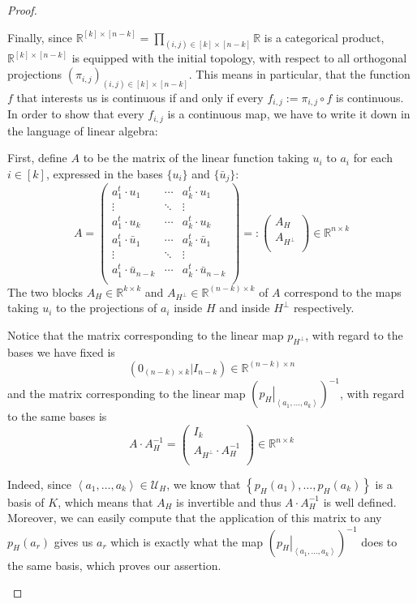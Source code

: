\begin{proof}
\begin{b_item}
Finally, since $\mathbb{R}^{[k]\times[n-k]}=\prod_{(i,j)\in[k]\times[n-k]}\mathbb{R}$ is a categorical product, $\mathbb{R}^{[k]\times[n-k]}$ is equipped with the initial topology, with respect to all orthogonal projections $\left(\pi_{i,j}\right)_{(i,j)\in[k]\times[n-k]}$. This means in particular, that the function $f$ that interests us is continuous if and only if every $f_{i,j}:=\pi_{i,j}\circ f$ is continuous. In order to show that every $f_{i,j}$ is a continuous map, we have to write it down in the language of linear algebra:

First, define $A$ to be the matrix of the linear function taking $u_i$ to $a_i$ for each $i\in[k]$, expressed in the bases $\{u_i\}$ and $\{\bar{u}_j\}$:
$$A=\left(\begin{array}{ccc}
a^t_1\cdot u_1&\cdots&a^t_k\cdot u_1\\
\vdots&\ddots&\vdots\\
a^t_1\cdot u_k&\cdots&a^t_k\cdot u_k\\
\hline
a^t_1\cdot \bar{u}_1&\cdots&a^t_k\cdot \bar{u}_1\\
\vdots&\ddots&\vdots\\
a^t_1\cdot \bar{u}_{n-k}&\cdots&a^t_k\cdot \bar{u}_{n-k}\\
\end{array}\right)=:
\left(\begin{array}{c}A_H\\\hline A_{H^{\perp}}\\
\end{array}\right)
\in\mathbb{R}^{n\times k}$$
The two blocks $A_H\in\mathbb{R}^{k\times k}$ and $A_{H^{\perp}}\in\mathbb{R}^{(n-k)\times k}$ of $A$ correspond to the maps taking $u_i$ to the projections of $a_i$ inside $H$ and inside $H^{\perp}$ respectively.

Notice that the matrix corresponding to the linear map $p_{H^{\perp}}$, with regard to the bases we have fixed is
$$\left(0_{(n-k)\times k}|I_{n-k}\right)\in\mathbb{R}^{(n-k)\times n}$$
and the matrix corresponding to the linear map $\left(\left.p_H\right|_{\left<a_1,\ldots,a_k\right>}\right)^{-1}$, with regard to the same bases is
$$A\cdot A_H^{-1}=\left(\begin{array}{c}I_k\\\hline A_{H^{\perp}}\cdot A_H^{-1}\\\end{array}\right)\in\mathbb{R}^{n\times k}$$

Indeed, since $\left<a_1,\ldots,a_k\right>\in\mathcal{U}_H$, we know that $\left\{p_H(a_1),\ldots,p_H(a_k)\right\}$ is a basis of $K$, which means that $A_H$ is invertible and thus $A\cdot A_H^{-1}$ is well defined. Moreover, we can easily compute that the application of this matrix to any $p_H(a_r)$ gives us $a_r$ which is exactly what the map $\left(\left.p_H\right|_{\left<a_1,\ldots,a_k\right>}\right)^{-1}$ does to the same basis, which proves our assertion.


\end{b_item}
\end{proof}
